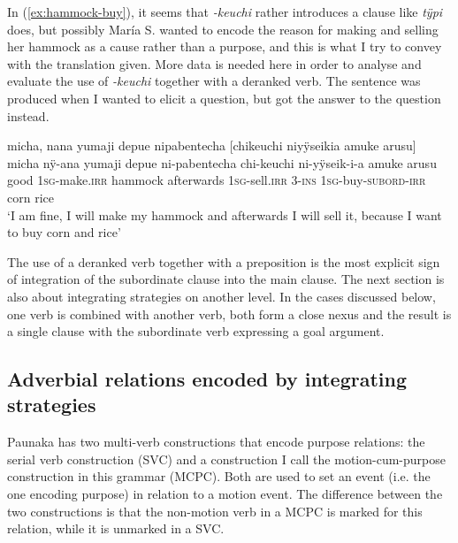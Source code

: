 In (\ref{ex:hammock-buy}), it seems that \textit{-keuchi} rather introduces a  clause like \textit{tÿpi} does, but possibly María S. wanted to encode the reason for making and selling her hammock as a cause rather than a purpose, and this is what I try to convey with the translation given. More data is needed here in order to analyse and evaluate the use of \textit{-keuchi} together with a deranked verb. The sentence was produced when I wanted to elicit a question, but got the answer to the question instead.

\ea\label{ex:hammock-buy}
\begingl
\glpreamble micha, nana yumaji depue nipabentecha \textup{[}chikeuchi niyÿseikia amuke arusu\textup{]}\\
\gla micha nÿ-ana yumaji depue ni-pabentecha chi-keuchi ni-yÿseik-i-a amuke arusu\\
\glb good 1\textsc{sg}-make.\textsc{irr} hammock afterwards 1\textsc{sg}-sell.\textsc{irr} 3-\textsc{ins}  1\textsc{sg}-buy-\textsc{subord}-\textsc{irr} corn rice\\
\glft ‘I am fine, I will make my hammock and afterwards I will sell it, because I want to buy corn and rice’
\endgl
\trailingcitation{[rxx-e181022le]}
\xe



The use of a deranked verb together with a preposition is the most explicit sign of integration of the subordinate clause into the main clause. The next section is also about integrating strategies on another level. In the cases discussed below, one verb is combined with another verb, both form a close nexus and the result is a single clause with the subordinate verb expressing a goal argument.

\subsection{Adverbial relations encoded by integrating strategies}\label{sec:SVC_and_MCPC}

Paunaka has two multi-verb constructions that encode purpose relations: the serial verb construction (SVC) and a construction I call the motion-cum-purpose construction in this grammar (MCPC). Both are used to set an event (i.e. the one encoding purpose) in relation to a motion event. The difference between the two constructions is that the non-motion verb in a MCPC is marked for this relation, while it is unmarked in a SVC.

